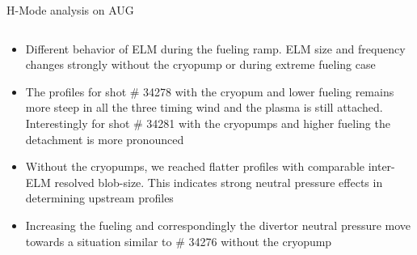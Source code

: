 \documentclass[10pt, compress]{beamer}
\newcommand\Fontvi{\fontsize{8}{7.2}\selectfont}
\begin{document}
\begin{frame}{H-Mode analysis on AUG}
\begin{columns}
\begin{column}{0.45\textwidth}
\begin{itemize}
    \item<2|only@2> Different behavior of ELM during the fueling
      ramp. ELM size and frequency changes strongly without the
      cryopump or during extreme fueling case
    \item<3|only@3> The profiles for shot \# 34278 with the cryopum
      and lower fueling remains more steep in all the three timing
      wind and the plasma is still attached. Interestingly for shot \#
      34281 with the cryopumps and higher fueling the detachment is
      more pronounced
    \item<4|only@4> Without the cryopumps, we reached flatter
         profiles with comparable inter-ELM resolved blob-size. This
         indicates strong neutral pressure effects in determining
         upstream profiles
    \item<5|only@5> Increasing the fueling and correspondingly the
      divertor neutral pressure move towards a situation similar to
      \# 34276 without the cryopump
      \end{itemize}
  \end{column}
\end{columns}
\end{frame}

\end{document}
